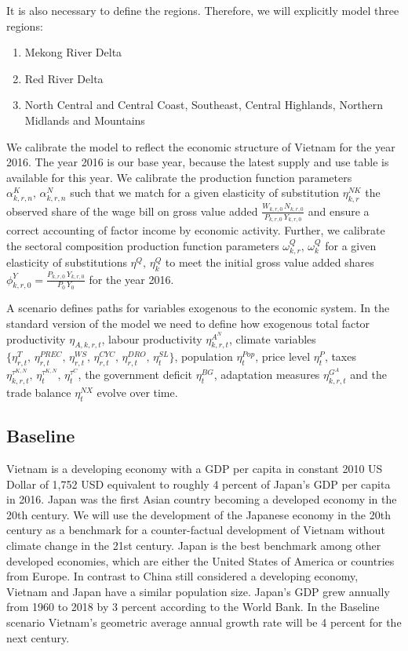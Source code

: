 \documentclass[10pt,a4paper]{article}
\begin{document}
It is also necessary to define the regions. Therefore, we will explicitly model three regions: 
\begin{enumerate}
	\item Mekong River Delta
	\item Red River Delta
	\item North Central and Central Coast, Southeast, Central Highlands, Northern Midlands and Mountains
\end{enumerate}

We calibrate the model to reflect the economic structure of Vietnam for the year 2016. The year 2016 is our base year, because the latest supply and use table is available for this year. We calibrate the production function parameters $\alpha^{K}_{k,r,n}, \, \alpha^{N}_{k,r,n}$ such that we match for a given elasticity of substitution $\eta^{NK}_{k,r}$ the observed share of the wage bill on gross value added $\frac{W_{k,r,0} \, N_{k,r,0}}{P_{k,r,0} \, Y_{k,r,0}}$ and ensure a correct accounting of factor income by economic activity. Further, we calibrate the sectoral composition production function parameters $\omega^{Q}_{k,r},\, \omega^{Q}_{k}$ for a given elasticity of substitutions $\eta^{Q}, \, \eta^{Q}_{k}$ to meet the initial gross value added shares $\phi^{Y}_{k,r,0} = \frac{P_{k,r,0} \, Y_{k,r,0}}{P_{0} \, Y_{0}}$ for the year 2016.

A scenario defines paths for variables exogenous to the economic system. In the standard version of the model we need to define how exogenous total factor productivity $\eta_{A,k,r,t}$, labour productivity $\eta^{A^N}_{k,r,t}$, climate variables $\{\eta^{T}_{r,t},\, \eta^{PREC}_{r,t},\, \eta^{WS}_{r,t},\, \eta^{CYC}_{r,t},\, \eta^{DRO}_{r,t},\, \eta^{SL}_{t}\}$, population $\eta^{Pop}_{t}$, price level $\eta^{P}_{t}$, taxes  $\eta^{\tau^{K,N}}_{k,r,t},\, \eta^{\tau^{K,N}}_{t},\, \eta^{\tau^{C}}_{t}$, the government deficit $\eta^{BG}_{t}$, adaptation measures $\eta^{G^{A}}_{k,r,t}$ and the trade balance $\eta^{NX}_{t}$ evolve over time. 

\subsection{Baseline}

Vietnam is a developing economy with a GDP per capita in constant 2010 US Dollar of 1,752 USD equivalent to roughly 4 percent of Japan's GDP per capita in 2016. Japan was the first Asian country becoming a developed economy in the 20th century. We will use the development of the Japanese economy in the 20th century as a benchmark for a counter-factual development of Vietnam without climate change in the 21st century. Japan is the best benchmark among other developed economies, which are either the United States of America or countries from Europe. In contrast to China still considered a developing economy, Vietnam and Japan have a similar population size. Japan's GDP grew annually from 1960 to 2018 by 3 percent according to the World Bank. In the Baseline scenario Vietnam's geometric average annual growth rate will be 4 percent for the next century.
\end{document}
